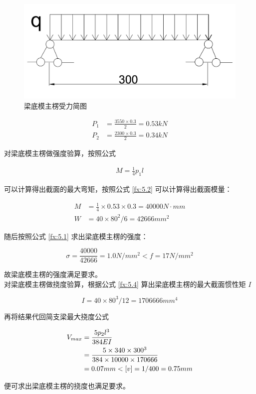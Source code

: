 \begin{figure}[thbp!]
    \centering
    \includegraphics[width=0.5\linewidth]{figure/c5f5.png}
    \caption{梁底模主楞受力简图}
    \label{fig:c5f5}
\end{figure}

\begin{align*}    P_1&=\frac{3550\times 0.3}{2}=0.53 kN\\
    P_2&=\frac{2300\times 0.3}{2}=0.34 kN
\end{align*}

对梁底模主楞做强度验算，按照公式

\begin{align}
    \label{fx:5.A}
    M=\frac{1}{4}p_1l
\end{align}

可以计算得出截面的最大弯矩，按照公式 \ref{fx:5.2} 可以计算得出截面模量：

\begin{align*}
    M&=\frac{1}{4}\times 0.53\times 0.3=40000 N \cdot mm\\
    W&=40\times 80^2 /6=42666 mm^2
\end{align*}

随后按照公式 \ref{fx:5.1} 求出梁底模主楞的强度：

\[
    \sigma = \frac{40000}{42666}=1.0 N/mm^2< f=17N/mm^2
\]

故梁底模主楞的强度满足要求。\\

对梁底模主楞做挠度验算，根据公式 \ref{fx:5.4} 算出梁底模主楞的最大截面惯性矩 $I$

\[
    I=40\times 80^3 /12=1706666 mm^4
\]

再将结果代回简支梁最大挠度公式 

\begin{align}
    V_{max}&=\frac{5p_2l^3}{384EI}\\
    &=\frac{5\times 340\times 300^3}{384\times 10000\times 170666} \notag \\
    &=0.07mm<[v]=1/400=0.75mm \notag
\end{align}

便可求出梁底模主楞的挠度也满足要求。\\

